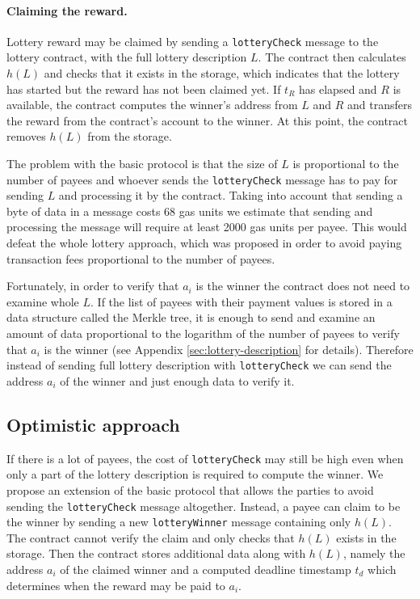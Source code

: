 \documentclass[a4paper]{article}
\begin{document}
    \paragraph{Claiming the reward.}
    Lottery reward may be claimed by sending a \texttt{lotteryCheck} message to the lottery contract, with the
    full lottery description $L$. The contract then calculates $h(L)$ and checks that it exists in the storage,
    which indicates that the lottery has started but the reward has not been claimed yet.
    If $t_R$ has elapsed and $R$ is available, the contract computes the winner's address from $L$ and $R$ and
    transfers the reward from the contract's account to the winner. At this point, the contract removes $h(L)$
    from the storage.

    The problem with the basic protocol is that the size of $L$ is proportional to the number of payees and whoever
    sends the \texttt{lotteryCheck} message has to pay for sending $L$ and processing it by the contract.
    Taking into account that sending a byte of data in a message costs 68 gas units we estimate that sending and
    processing the message will require at least 2000 gas units per payee. This would defeat the whole lottery
    approach, which was proposed in order to avoid paying transaction fees proportional to the number of payees.

    Fortunately, in order to verify that $a_i$ is the winner the contract does not need to examine whole $L$.
    If the list of payees with their payment values is stored in a data structure called the Merkle tree, it is
    enough to send and examine an amount of data proportional to the logarithm of the number of payees to verify
    that $a_i$ is the winner (see Appendix \ref{sec:lottery-description} for details). Therefore instead of sending
    full lottery description with \texttt{lotteryCheck} we can send the address $a_i$ of the winner and just enough
    data to verify it.

\subsection{Optimistic approach}
    If there is a lot of payees, the cost of \texttt{lotteryCheck} may still be high even when only a part of the
    lottery description is required to compute the winner. We propose an extension of the basic protocol that allows
    the parties to avoid sending the \texttt{lotteryCheck} message altogether. Instead, a payee can claim to be the
    winner by sending a new \texttt{lotteryWinner} message containing only $h(L)$. The contract cannot verify the
    claim and only checks that $h(L)$ exists in the storage. Then the contract stores additional data along with
    $h(L)$, namely the address $a_i$ of the claimed winner and a computed deadline timestamp $t_d$ which determines
    when the reward may be paid to $a_i$.
\end{document}
